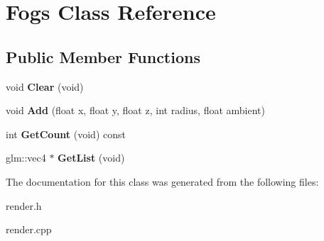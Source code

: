 \hypertarget{classFogs}{\section{\-Fogs \-Class \-Reference}
\label{classFogs}
}
\subsection*{\-Public \-Member \-Functions}
\begin{DoxyCompactItemize}
\item 
\hypertarget{classFogs_acafeea155d5753f71df0e6a9157a068c}{void {\bfseries \-Clear} (void)}\label{classFogs_acafeea155d5753f71df0e6a9157a068c}

\item 
\hypertarget{classFogs_a725dd132babc2d7b11ae57f07a31c634}{void {\bfseries \-Add} (float x, float y, float z, int radius, float ambient)}\label{classFogs_a725dd132babc2d7b11ae57f07a31c634}

\item 
\hypertarget{classFogs_acd0a7cb6b48b41420fa684fca82e7c38}{int {\bfseries \-Get\-Count} (void) const }\label{classFogs_acd0a7cb6b48b41420fa684fca82e7c38}

\item 
\hypertarget{classFogs_aaf0ffe1147111dde7ddc16ce4d85d5f5}{glm\-::vec4 $\ast$ {\bfseries \-Get\-List} (void)}\label{classFogs_aaf0ffe1147111dde7ddc16ce4d85d5f5}

\end{DoxyCompactItemize}


\-The documentation for this class was generated from the following files\-:\begin{DoxyCompactItemize}
\item 
render.\-h\item 
render.\-cpp\end{DoxyCompactItemize}
